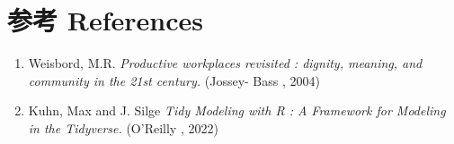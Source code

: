 \hypertarget{ux53c2ux8003-references}{%
\section{参考 References}\label{ux53c2ux8003-references}}

\begin{enumerate}
\tightlist
\item
  Weisbord, M.R. \emph{Productive workplaces revisited : dignity,
  meaning, and community in the 21st century.} (Jossey- Bass , 2004)
\item
  Kuhn, Max and J. Silge \emph{Tidy Modeling with R : A Framework for
  Modeling in the Tidyverse.} (O'Reilly , 2022)
\end{enumerate}



